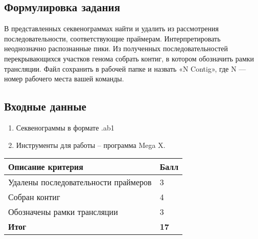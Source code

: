 
\subsection*{Формулировка задания}

В представленных секвенограммах найти и удалить из рассмотрения последовательности, соответствующие праймерам. Интерпретировать неоднозначно распознанные пики. Из полученных последовательностей перекрывающихся участков генома собрать контиг, в котором обозначить рамки трансляции. Файл сохранить в рабочей папке и назвать «N Contig», где N — номер рабочего места вашей команды.

\subsection*{Входные данные}

\begin{enumerate}
    \item Секвенограммы в формате .ab1 
    \item Инструменты для работы – программа Mega X.    
\end{enumerate}

\markSection

\begin{tabular}{|p{11cm}|p{3cm}|}
    \hline
    \textbf{Описание критерия} & \textbf{Балл} \\
    \hline
    \hline
    Удалены последовательности праймеров & 3 \\
    Собран контиг & 4 \\
    Обозначены рамки трансляции & 3 \\
    \hline
    \hline
    \textbf{Итог} & \textbf{17} \\
    \hline
\end{tabular}